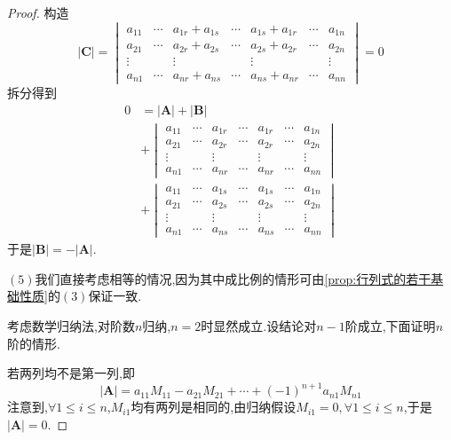 {\begin{proof}
        构造\[
            \left|\bm{C}\right|=\begin{vmatrix}
                a_{11} & \cdots & a_{1r}+a_{1s} & \cdots & a_{1s}+a_{1r} & \cdots & a_{1n} \\
                a_{21} & \cdots & a_{2r}+a_{2s} & \cdots & a_{2s}+a_{2r} & \cdots & a_{2n} \\
                \vdots &        & \vdots        &        & \vdots        &        & \vdots \\
                a_{n1} & \cdots & a_{nr}+a_{ns} & \cdots & a_{ns}+a_{nr} & \cdots & a_{nn}
            \end{vmatrix}=0
        \]拆分得到
        \begin{align*}
            0 & =\left|\bm{A}\right|+\left|\bm{B}\right|                      \\
              & +\begin{vmatrix}
                     a_{11} & \cdots & a_{1r} & \cdots & a_{1r} & \cdots & a_{1n} \\
                     a_{21} & \cdots & a_{2r} & \cdots & a_{2r} & \cdots & a_{2n} \\
                     \vdots &        & \vdots &        & \vdots &        & \vdots \\
                     a_{n1} & \cdots & a_{nr} & \cdots & a_{nr} & \cdots & a_{nn}
                 \end{vmatrix} \\
              & +\begin{vmatrix}
                     a_{11} & \cdots & a_{1s} & \cdots & a_{1s} & \cdots & a_{1n} \\
                     a_{21} & \cdots & a_{2s} & \cdots & a_{2s} & \cdots & a_{2n} \\
                     \vdots &        & \vdots &        & \vdots &        & \vdots \\
                     a_{n1} & \cdots & a_{ns} & \cdots & a_{ns} & \cdots & a_{nn}
                 \end{vmatrix}
        \end{align*}于是$\left|\bm{B}\right|=-\left|\bm{A}\right|.$

        $(5)$我们直接考虑相等的情况,因为其中成比例的情形可由\cref{prop:行列式的若干基础性质}的$(3)$保证一致.

        考虑数学归纳法,对阶数$n$归纳,$n=2$时显然成立.设结论对$n-1$阶成立,下面证明$n$阶的情形.

        若两列均不是第一列,即\[
            \left|\bm{A}\right|=a_{11}M_{11}-a_{21}M_{21}+\cdots+(-1)^{n+1}a_{n1}M_{n1}
        \]注意到,$\forall 1\leqslant i\leqslant n$,$M_{i1}$均有两列是相同的,由归纳假设$M_{i1}=0,\forall 1\leqslant i\leqslant n$,于是$\left|\bm{A}\right|=0.$


\end{proof}}
